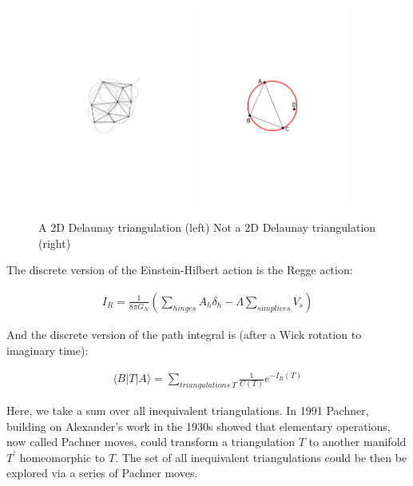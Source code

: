 \documentclass[12pt]{article}
\begin{document}
\begin{figure}
  \begin{center}
  \includegraphics[width=2in]{DT1.pdf}
   \includegraphics[width=2in]{NDT.pdf}
  \caption{A 2D Delaunay triangulation (left) Not a 2D Delaunay triangulation (right) \label{DT}}
  \end{center}
\end{figure}

The discrete version of the Einstein-Hilbert action is the Regge action:

\begin{align}
  I_{R}=\frac{1}{8\pi G_{N}}\left(\sum\limits_{hinges}A_{h}\delta_{h}-\Lambda\sum\limits_{simplices}V_{s}\right)\label{equation:Regge-Action}
\end{align}

And the discrete version of the path integral is (after a Wick rotation to imaginary time):

\begin{align}
  \langle B|T|A\rangle=\sum\limits_{triangulations\ T}\frac{1}{C(T)}e^{-I_{R}(T)} \label{CDT1}
\end{align}

Here, we take a sum over all inequivalent triangulations. In 1991 Pachner\cite{pachner_p.l._1991}, building on Alexander's work in the 1930s\cite{alexander_combinatorial_1930}
showed that elementary operations, now called Pachner moves, could transform a triangulation $T$ to another manifold $T^{\prime}$ homeomorphic to $T$. The set of all inequivalent
triangulations could be then be explored via a series of Pachner moves.\cite{gross_elementary_1992}
\end{document}
